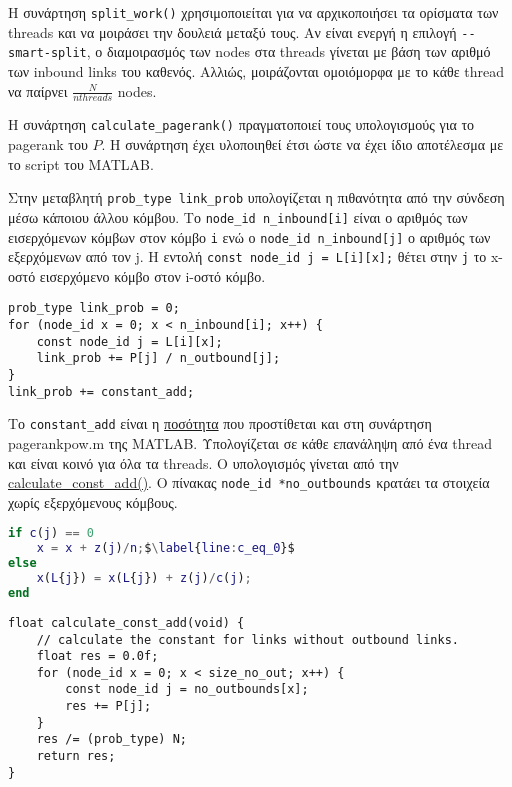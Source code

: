 Η συνάρτηση \lstinline!split_work()! χρησιμοποιείται για να αρχικοποιήσει τα ορίσματα των threads και να μοιράσει την δουλειά μεταξύ τους.
Αν είναι ενεργή η επιλογή \lstinline!--smart-split!, ο διαμοιρασμός των nodes στα threads γίνεται με βάση των αριθμό των inbound links του καθενός.
Αλλιώς, μοιράζονται ομοιόμορφα με το κάθε thread να παίρνει $\frac{N}{nthreads}$ nodes.

Η συνάρτηση \lstinline!calculate_pagerank()! πραγματοποιεί τους υπολογισμούς για το pa\-ge\-rank του $P$.
Η συνάρτηση έχει υλοποιηθεί έτσι ώστε να έχει ίδιο αποτέλεσμα με το script του MATLAB.

Στην μεταβλητή \lstinline!prob_type link_prob! υπολογίζεται η πιθανότητα από την σύνδεση μέσω κάποιου άλλου κόμβου.
Το \lstinline!node_id n_inbound[i]! είναι ο αριθμός των εισερχόμενων κόμβων στον κόμβο \lstinline!i!
ενώ ο \lstinline!node_id n_inbound[j]! ο αριθμός των εξερχόμενων από τον j.
Η εντολή \lstinline!const node_id j = L[i][x];! θέτει στην \lstinline!j! το x-οστό εισερχόμενο κόμβο στον i-οστό κόμβο.
\begin{lstlisting}[caption={υπολογισμός link\_prob}, escapechar=$]
prob_type link_prob = 0;
for (node_id x = 0; x < n_inbound[i]; x++) {
    const node_id j = L[i][x];
    link_prob += P[j] / n_outbound[j];
}
link_prob += constant_add;
\end{lstlisting}
Το \lstinline!constant_add! είναι η \hyperref[line:c_eq_0]{ποσότητα} που προστίθεται και στη συνάρτηση pagerankpow.m της MATLAB.
Υπολογίζεται σε κάθε επανάληψη από ένα thread και είναι κοινό για όλα τα threads.
Ο υπολογισμός γίνεται από την \hyperref[lst:calculate_const_add]{calculate\_const\_add()}.
Ο πίνακας \lstinline!node_id *no_outbounds! κρατάει τα στοιχεία χωρίς εξερχόμενους κόμβους.
\begin{lstlisting}[language=matlab, caption={το constant\_add στο pagerankpow.m}, escapechar=$]
if c(j) == 0
	x = x + z(j)/n;$\label{line:c_eq_0}$
else
	x(L{j}) = x(L{j}) + z(j)/c(j);
end
\end{lstlisting}

\begin{lstlisting}[caption={υπολογισμός const\_add}, escapechar=$, label={lst:calculate_const_add}]
float calculate_const_add(void) {
    // calculate the constant for links without outbound links.
    float res = 0.0f;
    for (node_id x = 0; x < size_no_out; x++) {
        const node_id j = no_outbounds[x];
        res += P[j];
    }
    res /= (prob_type) N;
    return res;
}
\end{lstlisting}

